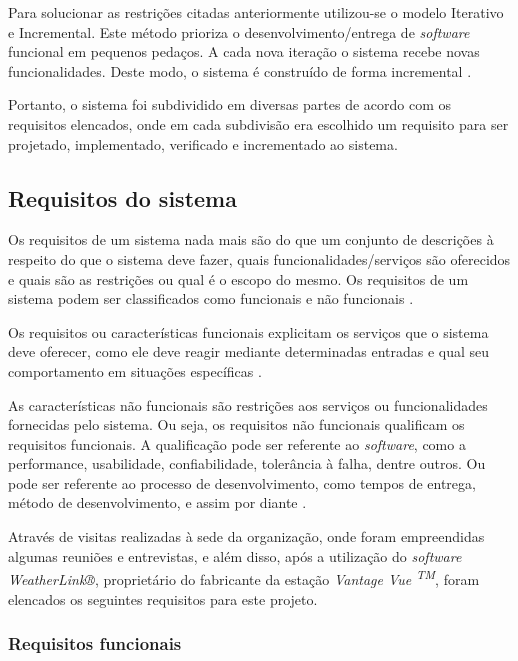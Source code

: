 Para solucionar as restrições citadas anteriormente utilizou-se o modelo Iterativo e Incremental. Este método prioriza o desenvolvimento/entrega de \textit{software} funcional em pequenos pedaços. A cada nova iteração o sistema recebe novas funcionalidades. Deste modo, o sistema é construído de forma incremental \cite{SITEINTERATIVOINCREMENTAL}.

Portanto, o sistema foi subdividido em diversas partes de acordo com os requisitos elencados, onde em cada subdivisão era escolhido um requisito para ser projetado, implementado, verificado e incrementado ao sistema.

\subsection{Requisitos do sistema} \label{subsec:requisitos}

Os requisitos de um sistema nada mais são do que um conjunto de descrições à respeito do que o sistema deve fazer, quais funcionalidades/serviços são oferecidos e quais são as restrições ou qual é o escopo do mesmo. Os requisitos de um sistema podem ser classificados como funcionais e não funcionais \cite{sommerville2011engenharia}.

Os requisitos ou características funcionais explicitam os serviços que o sistema deve oferecer, como ele deve reagir mediante determinadas entradas e qual seu comportamento em situações específicas \cite{sommerville2011engenharia, engsoftwilson}.

As características não funcionais são restrições aos serviços ou funcionalidades fornecidas pelo sistema. Ou seja, os requisitos não funcionais qualificam os requisitos funcionais. A qualificação pode ser referente ao \textit{software}, como a performance, usabilidade, confiabilidade, tolerância à falha, dentre outros. Ou pode ser referente ao processo de desenvolvimento, como tempos de entrega, método de desenvolvimento, e assim por diante \cite{introrequisitos}.

Através de visitas realizadas à sede da organização, onde foram empreendidas algumas reuniões e entrevistas, e além disso, após a utilização do \textit{software WeatherLink®}, proprietário do fabricante da estação \textit{Vantage Vue \textsuperscript{TM}}, foram elencados os seguintes requisitos para este projeto.


\subsubsection{Requisitos funcionais}

